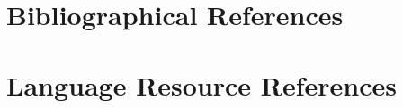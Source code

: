 \documentclass[10pt, a4paper]{article}
\begin{document}

\section{Bibliographical References}\label{sec:reference}




\section{Language Resource References}
\label{lr:ref}
\end{document}
